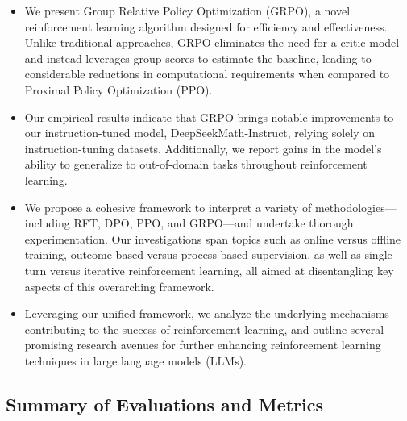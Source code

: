 \begin{itemize}[topsep=0pt]
    \item We present Group Relative Policy Optimization (GRPO), a novel reinforcement learning algorithm designed for efficiency and effectiveness. Unlike traditional approaches, GRPO eliminates the need for a critic model and instead leverages group scores to estimate the baseline, leading to considerable reductions in computational requirements when compared to Proximal Policy Optimization (PPO).
    \item Our empirical results indicate that GRPO brings notable improvements to our instruction-tuned model, DeepSeekMath-Instruct, relying solely on instruction-tuning datasets. Additionally, we report gains in the model's ability to generalize to out-of-domain tasks throughout reinforcement learning.
    \item We propose a cohesive framework to interpret a variety of methodologies—including RFT, DPO, PPO, and GRPO—and undertake thorough experimentation. Our investigations span topics such as online versus offline training, outcome-based versus process-based supervision, as well as single-turn versus iterative reinforcement learning, all aimed at disentangling key aspects of this overarching framework.
    \item Leveraging our unified framework, we analyze the underlying mechanisms contributing to the success of reinforcement learning, and outline several promising research avenues for further enhancing reinforcement learning techniques in large language models (LLMs).
\end{itemize}

\subsection{Summary of Evaluations and Metrics}

